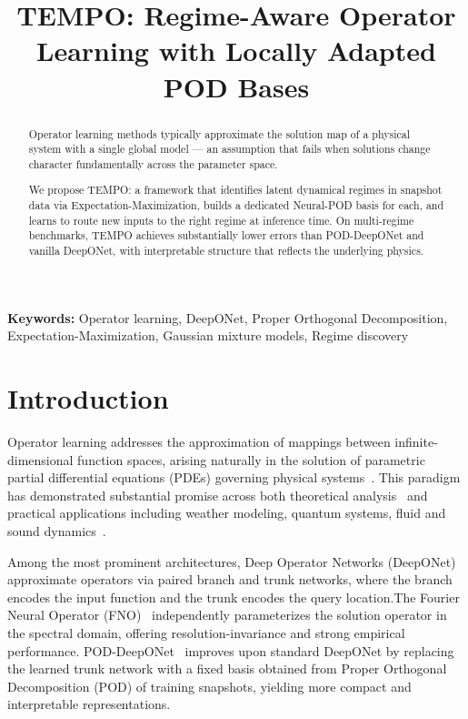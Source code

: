 \documentclass{article}
\title{TEMPO: Regime-Aware Operator Learning with Locally Adapted POD Bases}
\begin{document}
\maketitle

\begin{abstract}

Operator learning methods typically approximate the solution map of a physical system with a single global model — an assumption that fails when solutions change character fundamentally across the parameter space.

We propose TEMPO: a framework that identifies latent dynamical regimes in snapshot data via Expectation-Maximization, builds a dedicated Neural-POD basis for each, and learns to route new inputs to the right regime at inference time. On multi-regime benchmarks, TEMPO achieves substantially lower errors than POD-DeepONet and vanilla DeepONet, with interpretable structure that reflects the underlying physics.

\end{abstract}

\textbf{Keywords:} Operator learning, DeepONet, Proper Orthogonal Decomposition, Expectation-Maximization, Gaussian mixture models, Regime discovery

\section{Introduction}\label{sec:intro}

Operator learning addresses the approximation of mappings between infinite-dimensional function spaces, arising naturally in the solution of parametric partial differential equations (PDEs) governing physical systems~\cite{Kovachki2024}. This paradigm has demonstrated substantial promise across both  theoretical analysis~\cite{Kovachki2024, Lu2019} and practical applications including weather modeling, quantum systems, fluid and sound dynamics~\cite{Pathak2022, Olivieri2024,  Dave2025, Tucker2025}.

Among the most prominent architectures, Deep Operator Networks (DeepONet)~\cite{Lu2019} approximate operators via paired branch and trunk networks, where the branch encodes the input function and the trunk encodes the query location.The Fourier Neural Operator (FNO)~\cite{Li2020} independently parameterizes the solution operator in the spectral domain, offering resolution-invariance and strong empirical performance. POD-DeepONet~\cite{Lu2022} improves upon standard DeepONet by replacing the learned trunk network with a fixed basis obtained from Proper Orthogonal Decomposition (POD) of training snapshots, yielding more compact and interpretable representations.
\end{document}
